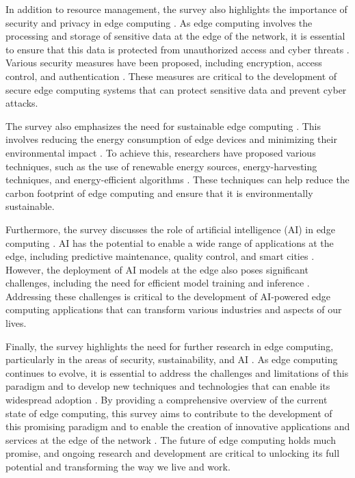 \documentclass[11pt]{article}
\begin{document}
In addition to resource management, the survey also highlights the importance of security and privacy in edge computing \cite{ref15}. As edge computing involves the processing and storage of sensitive data at the edge of the network, it is essential to ensure that this data is protected from unauthorized access and cyber threats \cite{ref153}. Various security measures have been proposed, including encryption, access control, and authentication \cite{ref154}. These measures are critical to the development of secure edge computing systems that can protect sensitive data and prevent cyber attacks.

The survey also emphasizes the need for sustainable edge computing \cite{ref155}. This involves reducing the energy consumption of edge devices and minimizing their environmental impact \cite{ref80}. To achieve this, researchers have proposed various techniques, such as the use of renewable energy sources, energy-harvesting techniques, and energy-efficient algorithms \cite{ref156}. These techniques can help reduce the carbon footprint of edge computing and ensure that it is environmentally sustainable.

Furthermore, the survey discusses the role of artificial intelligence (AI) in edge computing \cite{ref157}. AI has the potential to enable a wide range of applications at the edge, including predictive maintenance, quality control, and smart cities \cite{ref14}. However, the deployment of AI models at the edge also poses significant challenges, including the need for efficient model training and inference \cite{ref158}. Addressing these challenges is critical to the development of AI-powered edge computing applications that can transform various industries and aspects of our lives.

Finally, the survey highlights the need for further research in edge computing, particularly in the areas of security, sustainability, and AI \cite{ref159}. As edge computing continues to evolve, it is essential to address the challenges and limitations of this paradigm and to develop new techniques and technologies that can enable its widespread adoption \cite{ref8}. By providing a comprehensive overview of the current state of edge computing, this survey aims to contribute to the development of this promising paradigm and to enable the creation of innovative applications and services at the edge of the network \cite{ref53}. The future of edge computing holds much promise, and ongoing research and development are critical to unlocking its full potential and transforming the way we live and work.
\end{document}
